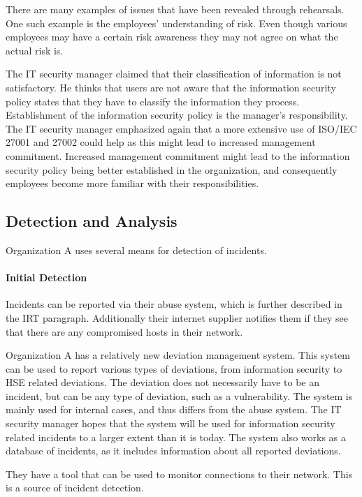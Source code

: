 There are many examples of issues that have been revealed through rehearsals. One such example is the employees' understanding of risk. Even though various employees may have a certain risk awareness they may not agree on what the actual risk is. 

The IT security manager claimed that their classification of information is not satisfactory. He thinks that users are not aware that the information security policy states that they have to classify the information they process. Establishment of the information security policy is the manager's responsibility. The IT security manager emphasized again that a more extensive use of \acs{ISO}/\acs{IEC} 27001 and 27002 could help as this might lead to increased management commitment. Increased management commitment  might lead to the information security policy being better established in the organization, and consequently employees become more familiar with their responsibilities.

\subsection{Detection and Analysis}
Organization A uses several means for detection of incidents.

\paragraph{Initial Detection}
Incidents can be reported via their abuse system, which is further described in the \ac{IRT} paragraph. Additionally their internet supplier notifies them if they see that there are any compromised hosts in their network. 

Organization A has a relatively new deviation management system. This system can be used to report various types of deviations, from information security to \ac{HSE} related deviations. The deviation does not necessarily have to be an incident, but can be any type of deviation, such as a vulnerability. The system is mainly used for internal cases, and thus differs from the abuse system. The IT security manager hopes that the system will be used for information security related incidents to a larger extent than it is today. The system also works as a database of incidents, as it includes information about all reported deviations.  

They have a tool that can be used to monitor connections to their network. This is a source of incident detection.

